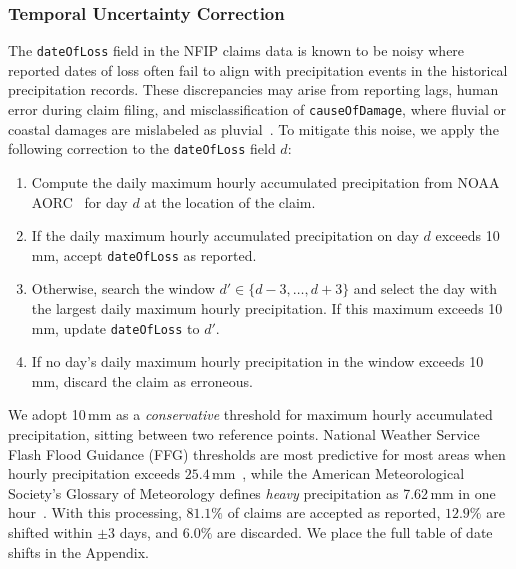 \subsubsection{Temporal Uncertainty Correction}\label{ssec:temporal_correction}
The \texttt{dateOfLoss} field in the NFIP claims data is known to be noisy where reported dates of loss often fail to align with precipitation events in the historical precipitation records.
%
These discrepancies may arise from reporting lags, human error during claim filing, and misclassification of \texttt{causeOfDamage}, where fluvial or coastal damages are mislabeled as pluvial~\cite{shin_systematic_2022}.
%
To mitigate this noise, we apply the following correction to the \texttt{dateOfLoss} field $d$:
\begin{enumerate}[nosep, align=left, leftmargin=*, left=1pt]
    \item Compute the daily maximum hourly accumulated precipitation from NOAA AORC~\cite{fall_analysis_2023} for day $d$ at the location of the claim.
    \item If the daily maximum hourly accumulated precipitation on day $d$ exceeds 10\,mm, accept \texttt{dateOfLoss} as reported.
    \item Otherwise, search the window $d' \in \{d-3, \ldots, d+3\}$ and select the day with the largest daily maximum hourly precipitation. If this maximum exceeds 10\,mm, update \texttt{dateOfLoss} to $d'$.
    \item If no day's daily maximum hourly precipitation in the window exceeds 10\,mm, discard the claim as erroneous.
\end{enumerate}

\noindent
We adopt 10\,mm as a \textit{conservative} threshold for maximum hourly accumulated precipitation, sitting between two reference points. 
%
National Weather Service Flash Flood Guidance (FFG) thresholds are most predictive for most areas when hourly precipitation exceeds \tsim$25.4$\,mm~\cite{james_precipitation_2024}, while the American Meteorological Society's Glossary of Meteorology defines \textit{heavy} precipitation as 7.62\,mm in one hour~\cite{ams_glossary_rain}.
%
With this processing, $81.1\%$ of claims are accepted as reported, $12.9\%$ are shifted within $\pm 3$ days, and $6.0\%$ are discarded.
%
We place the full table of date shifts in the Appendix.

